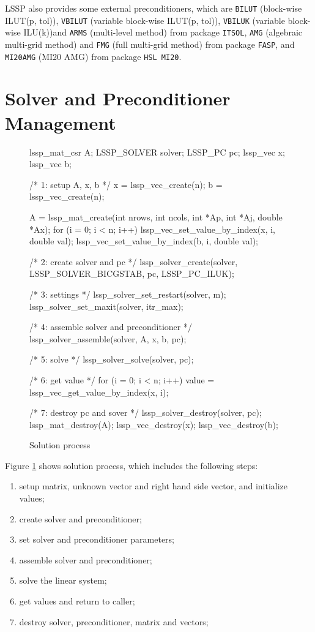 LSSP also provides some external preconditioners, which are \verb|BILUT| (block-wise ILUT(p, tol)),
\verb|VBILUT| (variable block-wise ILUT(p, tol)),
\verb|VBILUK| (variable block-wise ILU(k))and 
\verb|ARMS| (multi-level method) from package \verb|ITSOL|, \verb|AMG| (algebraic multi-grid method) 
and \verb|FMG| (full multi-grid method) from 
package \verb|FASP|, and \verb|MI20AMG| (MI20 AMG) from package \verb|HSL MI20|.

\section{Solver and Preconditioner Management}

\begin{figure}[!htb]
\begin{evb}
{
    lssp_mat_csr A;
    LSSP_SOLVER solver;
    LSSP_PC pc;
    lssp_vec x;
    lssp_vec b;

    /* 1: setup A, x, b */
    x = lssp_vec_create(n);
    b = lssp_vec_create(n);

    A = lssp_mat_create(int nrows, int ncols, int *Ap, int *Aj, double *Ax);
    for (i = 0; i < n; i++) {
        lssp_vec_set_value_by_index(x, i, double val);
        lssp_vec_set_value_by_index(b, i, double val);
    }

    /* 2: create solver and pc */
    lssp_solver_create(solver, LSSP_SOLVER_BICGSTAB, pc, LSSP_PC_ILUK);

    /* 3: settings */
    lssp_solver_set_restart(solver, m);
    lssp_solver_set_maxit(solver, itr_max);

    /* 4: assemble solver and preconditioner */
    lssp_solver_assemble(solver, A, x, b, pc);

    /* 5: solve */
    lssp_solver_solve(solver, pc);

    /* 6: get value */
    for (i = 0; i < n; i++) {
        value = lssp_vec_get_value_by_index(x, i);
    }

    /* 7: destroy pc and sover */
    lssp_solver_destroy(solver, pc);
    lssp_mat_destroy(A);
    lssp_vec_destroy(x);
    lssp_vec_destroy(b);
}
\end{evb}
    \caption{Solution process}
    \label{solution-proc}
\end{figure}

Figure \ref{solution-proc} shows solution process, which includes the following steps:
\begin{enumerate}
    \item setup matrix, unknown vector and right hand side vector, and initialize values;
    \item create solver and preconditioner;
    \item set solver and preconditioner parameters;
    \item assemble solver and preconditioner;
    \item solve the linear system;
    \item get values and return to caller;
    \item destroy solver, preconditioner, matrix and vectors;
\end{enumerate}

